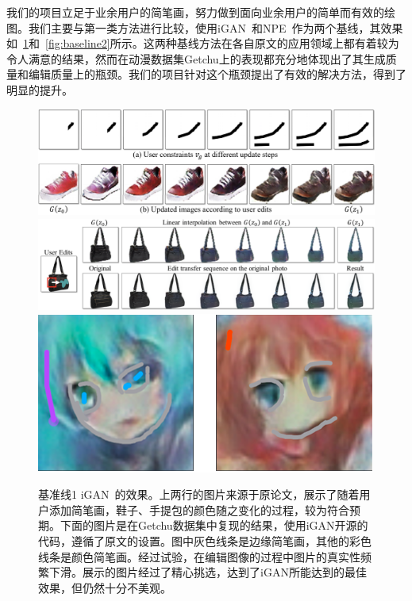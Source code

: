 \documentclass[a4paper,12pt,UTF8]{ctexart}
\newcommand{\kai}{\CJKfamily{zhkai}}	%
\begin{document}
我们的项目立足于业余用户的简笔画，努力做到面向业余用户的简单而有效的绘图。我们主要与第一类方法进行比较，使用iGAN~\cite{Zhu2016Generative}和NPE~\cite{Brock2016Neural}作为两个基线，其效果如~\ref{fig:baseline1}和~\ref{fig:baseline2}所示。这两种基线方法在各自原文的应用领域上都有着较为令人满意的结果，然而在动漫数据集Getchu上的表现都充分地体现出了其生成质量和编辑质量上的瓶颈。我们的项目针对这个瓶颈提出了有效的解决方法，得到了明显的提升。

\begin{figure}[H]
  \centering
  \includegraphics[width=0.9\linewidth]{figs/baseline_shoe.PNG}
  \includegraphics[width=0.9\linewidth]{figs/baseline_handbag.PNG}
  \includegraphics[width=0.9\linewidth]{figs/baseline1.PNG}
  \caption{\kai 基准线1 iGAN~\cite{Zhu2016Generative}的效果。上两行的图片来源于原论文，展示了随着用户添加简笔画，鞋子、手提包的颜色随之变化的过程，较为符合预期。下面的图片是在Getchu数据集中复现的结果，使用iGAN开源的代码，遵循了原文的设置。图中灰色线条是边缘简笔画，其他的彩色线条是颜色简笔画。经过试验，在编辑图像的过程中图片的真实性频繁下滑。展示的图片经过了精心挑选，达到了iGAN所能达到的最佳效果，但仍然十分不美观。}
  \label{fig:baseline1}
\end{figure}
\end{document}
